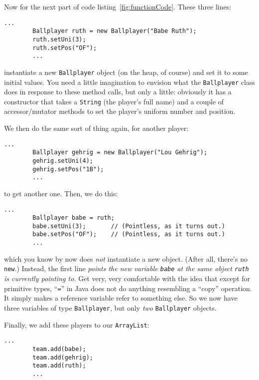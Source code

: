 Now for the next part of code listing~\ref{fig:functionCode}. These three
lines:

\begin{Verbatim}[fontsize=\small,samepage=true,frame=single]
        ...
        Ballplayer ruth = new Ballplayer("Babe Ruth");
        ruth.setUni(3);
        ruth.setPos("OF");
        ...
\end{Verbatim}

instantiate a new \texttt{Ballplayer} object (on the heap, of course) and set
it to some initial values. You need a little imagination to envision what the
\texttt{Ballplayer} class does in response to these method calls, but only a
little: obviously it has a constructor that takes a \texttt{String} (the
player's full name) and a couple of accessor/mutator methods to set the
player's uniform number and position. 

\pagebreak
We then do the same sort of thing again, for another player:

\begin{Verbatim}[fontsize=\small,samepage=true,frame=single]
        ...
        Ballplayer gehrig = new Ballplayer("Lou Gehrig");
        gehrig.setUni(4);
        gehrig.setPos("1B");
        ...
\end{Verbatim}

to get another one. Then, we do this:

\begin{Verbatim}[fontsize=\small,samepage=true,frame=single]
        ...
        Ballplayer babe = ruth;
        babe.setUni(3);       // (Pointless, as it turns out.)
        babe.setPos("OF");    // (Pointless, as it turns out.)
        ...
\end{Verbatim}

which you know by now does \textit{not} instantiate a new object. (After all,
there's no \texttt{new}.) Instead, the first line \textit{points the new
variable \texttt{babe} at the same object \texttt{ruth} is currently pointing
to.} Get very, very comfortable with the idea that except for primitive types,
``\texttt{=}'' in Java does not do anything resembling a ``copy'' operation. It
simply makes a reference variable refer to something else. So we now have
three variables of type \texttt{Ballplayer}, but only \textit{two}
\texttt{Ballplayer} objects.

Finally, we add these players to our \texttt{ArrayList}:

\begin{Verbatim}[fontsize=\small,samepage=true,frame=single]
        ...
        team.add(babe);
        team.add(gehrig);
        team.add(ruth);
        ...
\end{Verbatim}

